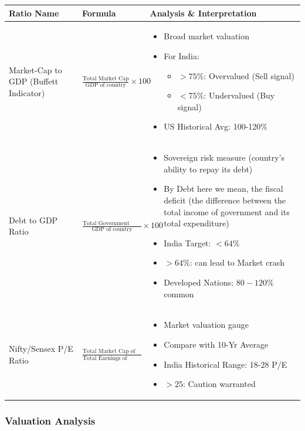 \documentclass[12pt]{article}
\begin{document}
\renewcommand{\arraystretch}{1.5}
\begin{longtable}{|>{\raggedright\arraybackslash}m{4.5cm}|>{\raggedright\arraybackslash}m{5cm}|>{\raggedright\arraybackslash}m{6cm}|}
\hline
\textbf{Ratio Name} & \textbf{Formula} & \textbf{Analysis \& Interpretation} \\
\hline
Market-Cap to GDP (Buffett Indicator) & 
$\frac{\text{Total Market Cap}}{\text{GDP of country}} \times 100$ &
\begin{itemize}
\item Broad market valuation
\item For India:
\begin{itemize}
\item $>75\%$: Overvalued (Sell signal)
\item $<75\%$: Undervalued (Buy signal)
\end{itemize}
\item US Historical Avg: 100-120\%
\end{itemize} \\
\hline

Debt to GDP Ratio & 
$\frac{\text{Total Government Debt}}{\text{GDP of country}} \times 100$ &
\begin{itemize}
\item Sovereign risk measure (country's ability to repay its debt)
\item By Debt here we mean, the fiscal deficit (the difference between the total income of government and its total expenditure)
\item India Target: $<64\%$
\item $>64\%$: can lead to Market crash
\item Developed Nations: $80-120\%$ common
\end{itemize} \\
\hline

Nifty/Sensex P/E Ratio & 
$\frac{\text{Total Market Cap of Nifty 50}}{\text{Total Earnings of Nifty 50}}$ &
\begin{itemize}
\item Market valuation gauge
\item Compare with 10-Yr Average
\item India Historical Range: 18-28 P/E
\item $>25$: Caution warranted
\end{itemize} \\
\hline
\end{longtable}

\subsubsection{Valuation Analysis}
\end{document}
